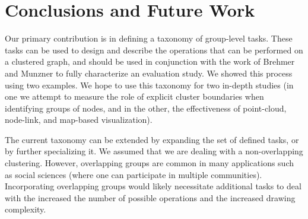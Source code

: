 \documentclass{article}
\begin{document}
\section{Conclusions and Future Work}
Our primary contribution is in defining a taxonomy of group-level tasks. These tasks can be used to design and describe the operations that can be performed on a clustered graph, and should be used in conjunction with the work of Brehmer and Munzner to fully characterize an evaluation study. We showed this process using two examples.
We hope to use this taxonomy for two in-depth studies (in one we attempt to measure the role of explicit cluster boundaries when identifying groups of nodes, and in the other, the effectiveness of point-cloud, node-link, and map-based visualization).

The current taxonomy can be extended by expanding the set of defined tasks, or by further specializing it. We assumed that we are dealing with a non-overlapping clustering. However, overlapping groups are common in many applications such as social sciences (where one can participate in multiple communities). Incorporating overlapping groups would likely necessitate additional tasks to deal with the increased the number of possible operations and the increased drawing complexity.












\end{document}
